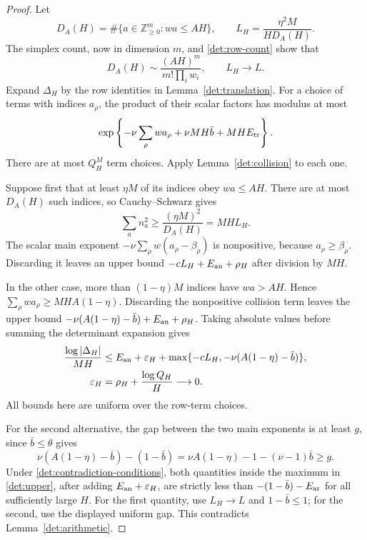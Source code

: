 \documentclass[11pt]{article}
\newcommand{\ZZ}{\mathbb Z}
\theoremstyle{definition}
\theoremstyle{remark}
\numberwithin{equation}{section}
\begin{document}
\begin{proof}
Let
\[
 D_A(H)=\#\{a\in\ZZ_{\ge0}^m:wa\le AH\},
 \qquad L_H=\frac{\eta^2M}{H D_A(H)}.
\]
The simplex count, now in dimension $m$, and
\eqref{det:row-count} show that
\[
 D_A(H)\sim\frac{(AH)^m}{m!\prod_iw_i},
 \qquad L_H\longrightarrow L.
\]
Expand $\Delta_H$ by the row identities in
Lemma~\ref{det:translation}.  For a choice of terms with indices
$a_\rho$, the product of their scalar factors has modulus at most
\[
 \exp\left\{-\nu\sum_\rho wa_\rho
             +\nu MH\bar b+MH E_{\rm tr}\right\}.
\]
There are at most $Q_H^M$ term choices.  Apply
Lemma~\ref{det:collision} to each one.

Suppose first that at least $\eta M$ of its indices obey $wa\le AH$.
There are at most $D_A(H)$ such indices, so Cauchy--Schwarz gives
\[
 \sum_a n_a^2\ge\frac{(\eta M)^2}{D_A(H)}=MH L_H.
\]
The scalar main exponent $-\nu\sum_\rho w(a_\rho-\beta_\rho)$ is
nonpositive, because $a_\rho\ge\beta_\rho$.  Discarding it leaves
an upper bound $-cL_H+E_{\rm an}+\rho_H$ after division by $MH$.

In the other case, more than $(1-\eta)M$ indices have $wa>AH$.
Hence $\sum_\rho wa_\rho\ge MH A(1-\eta)$.  Discarding the
nonpositive collision term leaves the upper bound
$-\nu(A(1-\eta)-\bar b)+E_{\rm an}+\rho_H$.
Taking absolute values before summing the determinant expansion gives
\begin{equation}
 \begin{aligned}
 \frac{\log|\Delta_H|}{MH}
 &\le E_{\rm an}+\varepsilon_H+
       \max\{-cL_H,-\nu(A(1-\eta)-\bar b)\},\\
 \varepsilon_H&=\rho_H+\frac{\log Q_H}{H}\longrightarrow0.
 \end{aligned}
 \label{det:upper}
\end{equation}
All bounds here are uniform over the row-term choices.

For the second alternative, the gap between the two main exponents
is at least $g$, since $\bar b\le\theta$ gives
\[
 \nu(A(1-\eta)-\bar b)-(1-\bar b)
 =\nu A(1-\eta)-1-(\nu-1)\bar b\ge g.
\]
Under \eqref{det:contradiction-conditions}, both quantities inside the
maximum in \eqref{det:upper}, after adding
$E_{\rm an}+\varepsilon_H$, are strictly less than
$-(1-\bar b)-E_{\rm ar}$ for all sufficiently large $H$.  For the
first quantity, use $L_H\to L$ and $1-\bar b\le1$; for the second,
use the displayed uniform gap.  This contradicts
Lemma~\ref{det:arithmetic}.
\end{proof}
\end{document}
